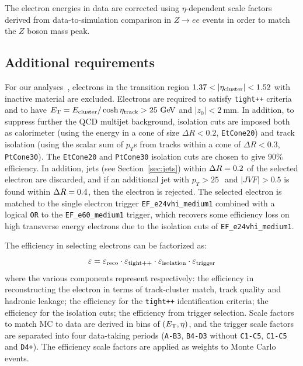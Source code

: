 The electron energies in data are corrected using $\eta$-dependent  scale factors derived
from data-to-simulation comparison in $Z\to ee$ events in order to match the $Z$ boson 
mass peak.


\tocless\subsection{Additional requirements}\label{sec:REQtrigger}

For our analyses~\cite{topcommon2013}, electrons in the transition region $1.37<|\eta_{\rm cluster}| <1.52$
with inactive material are excluded. Electrons are required to satisfy \texttt{tight++} criteria and to
 have $\et = E_{\rm cluster}/\cosh\eta_{\rm track} > 25\gev$ and $|z_0|<2~$mm.
In addition, to suppress further the QCD multijet background, 
isolation cuts are imposed both as calorimeter (using the energy in a cone of size $\Delta R<0.2$, \texttt{EtCone20})
and track isolation (using the scalar sum of $p_T$s from tracks within a cone of $\Delta R<0.3$, \texttt{PtCone30}). 
The \texttt{EtCone20} and \texttt{PtCone30} isolation cuts are chosen to give
90\% efficiency.
In addition, jets (see Section~\ref{sec:jets}) within $\dr =0.2$ of the selected electron are 
discarded, and if an additional jet with $p_T>25~$\gev\  and $|JVF|>0.5$ is found within $\dr =0.4$,
then the electron is rejected.
The selected electron is matched to the single electron trigger \texttt{EF\_e24vhi\_medium1}
combined with a logical \texttt{OR} to the \texttt{EF\_e60\_medium1} trigger, which
recovers some efficiency loss on high transverse energy electrons due
to the isolation cuts of \texttt{EF\_e24vhi\_medium1}. %

The efficiency in selecting electrons can be factorized as:
\begin{equation}\label{eq:eleeff}
\varepsilon = \varepsilon_{\rm reco} \cdot\varepsilon_{\rm tight++} \cdot\varepsilon_{\rm isolation} \cdot\varepsilon_{\rm trigger} 
	\end{equation}
where the various components represent respectively: the efficiency in reconstructing the electron 
in terms of track-cluster match, track quality and hadronic leakage; the efficiency
for the \texttt{tight++} identification criteria; the efficiency for the isolation cuts;
the efficiency from trigger selection. Scale factors to match MC to data
are derived in bins of $(\ET,\eta)$,
and the trigger scale factors are separated into four data-taking periods 
(\texttt{A-B3}, \texttt{B4-D3} without \texttt{C1-C5}, \texttt{C1-C5} and \texttt{D4+}).
The efficiency scale factors are applied as weights to Monte Carlo events.

